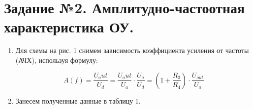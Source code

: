 \documentclass[12pt,a4paper]{article}
\begin{document}
\section{Задание №2. Амплитудно-частоотная характеристика ОУ.}


\begin{enumerate}
    \item Для схемы на рис. 1 снимем зависимость коэффициента усиления от частоты (АЧХ), используя формулу:
    
    \begin{equation}
        A(f) = \frac{U_out}{U_d}=\frac{U_out}{U_a}\cdot\frac{U_a}{U_d} = (1+\frac{R_3}{R_4})\cdot \frac{U_{out}}{U_a}
     \end{equation}

    \item Занесем полученные данные в таблицу 1.
    

\end{enumerate}
\end{document}
